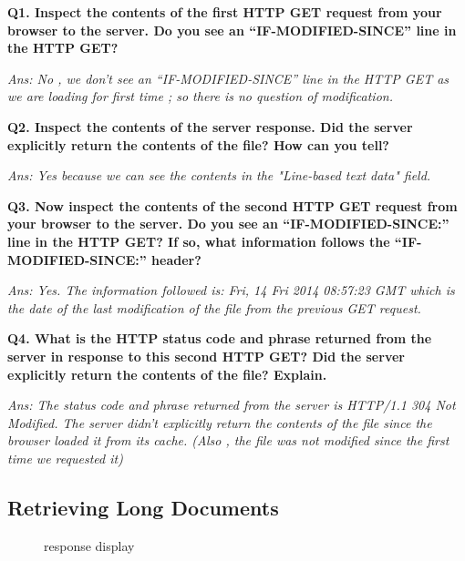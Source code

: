 \documentclass[11pt]{article}
\numberwithin{equation}{section}
\begin{document}



\textbf{Q1. Inspect the contents of the first HTTP GET request from your browser to the server. Do you see an “IF-MODIFIED-SINCE” line in the HTTP GET?}

\textsl{Ans: No , we don't see an “IF-MODIFIED-SINCE” line in the HTTP GET as we are loading for first time ; so there is no question of modification.} \newline

\textbf{Q2. Inspect the contents of the server response. Did the server explicitly return the contents of the file? How can you tell?}

\textsl{Ans: Yes because we can see the contents in the "Line-based text data" field.}\newline

\textbf{Q3. Now inspect the contents of the second HTTP GET request from your browser to the server. Do you see an “IF-MODIFIED-SINCE:” line in the HTTP GET? If so, what information follows the “IF-MODIFIED-SINCE:” header?} 

\textsl{Ans: Yes. The information followed is: Fri, 14 Fri 2014 08:57:23 GMT which is the date of the last modification of the file from the previous GET request.}\newline

\textbf{Q4. What is the HTTP status code and phrase returned from the server in response to this second HTTP GET? Did the server explicitly return the contents of the file? Explain.} 

\textsl{Ans: The status code and phrase returned from the server is HTTP/1.1 304 Not Modified. The server didn’t explicitly return the contents of the file since the browser loaded it from its cache. (Also , the file was not modified since the first time we requested it)}
\subsection*{Retrieving Long Documents}

\begin{figure}[H]
\begin{center}
		\centering
		\caption{response display}
		\label{fig:q1_f1_a}
\end{center}
\end{figure} 
\end{document}
